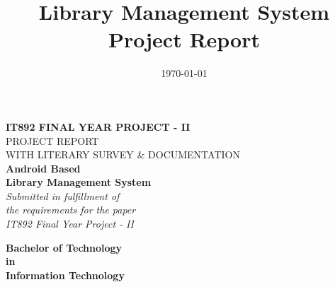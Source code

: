 \documentclass[11pt, a4paper]{thesis}
\date{\today}
\title{Library Management System Project Report}
\begin{document}
\begin{titlepage}

\begin{center}

\textup{\small {\bf IT892 FINAL YEAR PROJECT - II} \\ PROJECT REPORT\\
WITH LITERARY SURVEY \& DOCUMENTATION}\\[0.2in]

\Large \textbf {Android Based\\Library Management System}\\[0.2in]

       \small \emph{Submitted in fulfillment of\\
        the requirements for the paper\\IT892 Final Year Project - II}
        \vspace{.1in}

       {\bf Bachelor of Technology \\in\\ Information Technology}\\[0.2in]


\end{center}
\end{titlepage}
\end{document}
